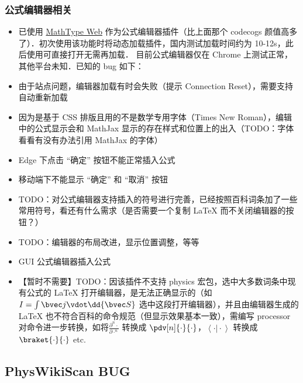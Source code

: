 \subsubsection{公式编辑器相关}
\begin{itemize}
\item 已使用 \href{http://www.wiris.net/client/editor/resources/help.html?v=7.9.0.6564}{MathType Web} 作为公式编辑器插件（比上面那个 codecogs 颜值高多了）．初次使用该功能时将动态加载插件，国内测试加载时间约为 10-12s，此后使用可直接打开无需再加载．
目前公式编辑器仅在 Chrome 上测试正常，其他平台未知．已知的 bug 如下：

\item 由于站点问题，编辑器加载有时会失败（提示 Connection Reset），需要支持自动重新加载

\item 因为是基于 CSS 排版且用的不是数学专用字体（Times New Roman），编辑中的公式显示会和 MathJax 显示的存在样式和位置上的出入（TODO：字体看看有没有办法引用 MathJax 的字体）

\item Edge 下点击 “确定” 按钮不能正常插入公式

\item 移动端下不能显示 “确定” 和 “取消” 按钮

\item TODO：对公式编辑器支持插入的符号进行完善，已经按照百科词条加了一些常用符号，看还有什么需求（是否需要一个复制 LaTeX 而不关闭编辑器的按钮？）

\item TODO：编辑器的布局改进，显示位置调整，等等

\item GUI 公式编辑器插入公式

\item 【暂时不需要】TODO：因该插件不支持 physics 宏包，选中大多数词条中现有公式的 LaTeX 打开编辑器，是无法正确显示的（如 $I = \int\bvec j \vdot \dd{\bvec S}$ 选中这段打开编辑器），并且由编辑器生成的 LaTeX 也不符合百科的命令规范（但显示效果基本一致），需编写 processor 对命令进一步转换，如将$\frac{\partial^{n}{\cdot}}{\partial{\cdot}^{n}}$ 转换成 $\pdv[n]{\cdot}{\cdot}$，$\left\langle{\cdot}\vert{\cdot}\right\rangle$ 转换成 $\braket{\cdot}{\cdot}$ etc.
\end{itemize}

\subsection{PhysWikiScan BUG}

